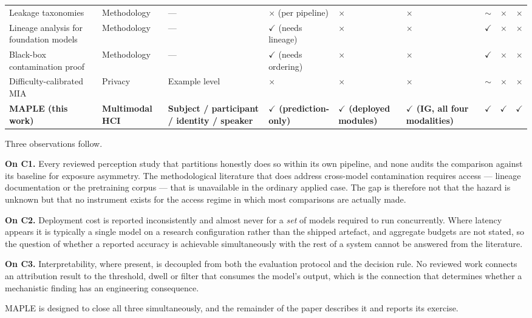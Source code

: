 \begin{table}[pos=htbp]
\begin{tabularx}{\textwidth}{XXXXXXccc}
Leakage taxonomies & Methodology & --- & $\times$ (per pipeline) & $\times$ & $\times$ & $\sim$ & $\times$ & $\times$ \\
Lineage analysis for foundation models & Methodology & --- & $\checkmark$ (needs lineage) & $\times$ & $\times$ & $\checkmark$ & $\times$ & $\times$ \\
Black-box contamination proof & Methodology & --- & $\checkmark$ (needs ordering) & $\times$ & $\times$ & $\checkmark$ & $\times$ & $\times$ \\
Difficulty-calibrated MIA & Privacy & Example level & $\times$ & $\times$ & $\times$ & $\sim$ & $\times$ & $\times$ \\
\textbf{MAPLE (this work)} & \textbf{Multimodal HCI} & \textbf{Subject / participant / identity / speaker} & \textbf{$\checkmark$ (prediction-only)} & \textbf{$\checkmark$ (deployed modules)} & \textbf{$\checkmark$ (IG, all four modalities)} & \textbf{$\checkmark$} & \textbf{$\checkmark$} & \textbf{$\checkmark$} \\
\bottomrule
\end{tabularx}
\end{table}

Three observations follow.

\textbf{On C1.} Every reviewed perception study that partitions honestly does so within its own pipeline, and none audits the comparison against its baseline for exposure asymmetry. The methodological literature that does address cross-model contamination requires access --- lineage documentation or the pretraining corpus --- that is unavailable in the ordinary applied case. The gap is therefore not that the hazard is unknown but that no instrument exists for the access regime in which most comparisons are actually made.

\textbf{On C2.} Deployment cost is reported inconsistently and almost never for a \emph{set} of models required to run concurrently. Where latency appears it is typically a single model on a research configuration rather than the shipped artefact, and aggregate budgets are not stated, so the question of whether a reported accuracy is achievable simultaneously with the rest of a system cannot be answered from the literature.

\textbf{On C3.} Interpretability, where present, is decoupled from both the evaluation protocol and the decision rule. No reviewed work connects an attribution result to the threshold, dwell or filter that consumes the model's output, which is the connection that determines whether a mechanistic finding has an engineering consequence.

MAPLE is designed to close all three simultaneously, and the remainder of the paper describes it and reports its exercise.
